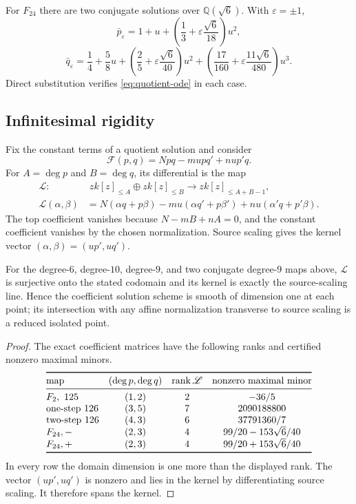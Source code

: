 \documentclass[11pt,reqno]{amsart}
\begin{document}
For \(F_{24}\) there are two conjugate solutions over
\(\mathbb Q(\sqrt6)\).  With \(\varepsilon=\pm1\),
\[
\bar p_\varepsilon
=1+u+\left(\frac13+\varepsilon\frac{\sqrt6}{18}\right)u^2,
\]
\[
\bar q_\varepsilon
=\frac14+\frac58u
+\left(\frac25+\varepsilon\frac{\sqrt6}{40}\right)u^2
+\left(\frac{17}{160}
+\varepsilon\frac{11\sqrt6}{480}\right)u^3.
\]
Direct substitution verifies \eqref{eq:quotient-ode} in each case.

\subsection{Infinitesimal rigidity}

Fix the constant terms of a quotient solution and consider
\[
 \mathcal F(p,q)=Npq-mupq'+nup'q.
\]
For \(A=\deg p\) and \(B=\deg q\), its differential is the map
\begin{equation}
\label{eq:face-linearization}
\begin{aligned}
 \mathscr L:
 &\;z k[z]_{\le A}\oplus z k[z]_{\le B}
 \longrightarrow z k[z]_{\le A+B-1},\\
 \mathscr L(\alpha,\beta)
 &=N(\alpha q+p\beta)
 -mu(\alpha q'+p\beta')
 +nu(\alpha'q+p'\beta).
\end{aligned}
\end{equation}
The top coefficient vanishes because \(N-mB+nA=0\), and the constant
coefficient vanishes by the chosen normalization.  Source scaling gives the
kernel vector \((\alpha,\beta)=(up',uq')\).

\begin{proposition}
\label{prop:face-rigidity}
For the degree-\(6\), degree-\(10\), degree-\(9\), and two conjugate
degree-\(9\) maps above, \(\mathscr L\) is surjective onto the stated
codomain and its kernel is exactly the source-scaling line.  Hence the
coefficient solution scheme is smooth of dimension one at each point; its
intersection with any affine normalization transverse to source scaling is
a reduced isolated point.
\end{proposition}

\begin{proof}
The exact coefficient matrices have the following ranks and certified
nonzero maximal minors.
\[
\begin{array}{@{}lccc@{}}
\toprule
\text{map} & (\deg p,\deg q) & \operatorname{rank}\mathscr L
& \text{nonzero maximal minor}\\
\midrule
F_2,\ 125 &(1,2)&2&-36/5\\
\text{one-step }126 &(3,5)&7&2090188800\\
\text{two-step }126 &(4,3)&6&37791360/7\\
F_{24},- &(2,3)&4&99/20-153\sqrt6/40\\
F_{24},+ &(2,3)&4&99/20+153\sqrt6/40\\
\bottomrule
\end{array}
\]
In every row the domain dimension is one more than the displayed rank.
The vector \((up',uq')\) is nonzero and lies in the kernel by
differentiating source scaling.  It therefore spans the kernel.
\end{proof}
\end{document}
